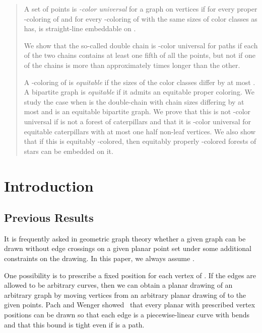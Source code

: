 \documentclass[12pt]{article}
\begin{document}
\begin{abstract}
A set  of  points is \emph{-color universal} for a graph  on  vertices if for every proper 
-coloring of  and for every -coloring of  with the same sizes of color classes as  has, 
 is straight-line embeddable on .

We show that the so-called double chain is -color universal for paths if each of the two
chains contains at least one fifth of all the points, but not if one of the chains is more than 
approximately  times longer than the other.

A -coloring of  is \emph{equitable} if the sizes of the color classes differ by at most .
A bipartite graph is \emph{equitable} if it admits an equitable proper coloring.
We study the case when  is the double-chain with chain sizes differing 
by at most  and  is an equitable bipartite graph. We prove that this  is not -color universal 
if  is not a forest of caterpillars and that it is -color universal for equitable caterpillars 
with at most one half non-leaf vertices. 
We also show that if this  is equitably -colored, then equitably properly -colored 
forests of stars can be embedded on it.

\end{abstract}



\maketitle


\section{Introduction}
\subsection{Previous Results}
It is frequently asked in geometric graph theory whether
a given graph  can be drawn without edge crossings on a given planar point set  
under some additional constraints on the drawing. In this paper, we always assume 
.

One possibility is to prescribe a fixed position for each vertex of .
If the edges are allowed to be arbitrary curves, then we can obtain a planar drawing 
of an arbitrary graph  by moving vertices from an arbitrary planar drawing of  
to the given points. Pach and Wenger showed~\cite{pachwenger} that every planar  with 
prescribed vertex positions can be drawn so that each edge is a piecewise-linear curve with  
bends and that this bound is tight even if  is a path.
\end{document}
